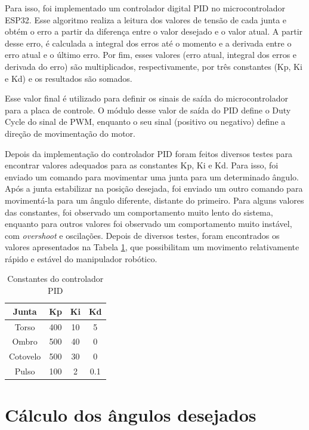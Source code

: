 Para isso, foi implementado um controlador digital PID no microcontrolador ESP32.
Esse algoritmo realiza a leitura dos valores de tensão de cada junta e obtém o erro a partir da diferença entre o valor desejado e o valor atual.
A partir desse erro, é calculada a integral dos erros até o momento e a derivada entre o erro atual e o último erro.
Por fim, esses valores (erro atual, integral dos erros e derivada do erro) são multiplicados, respectivamente, por três constantes (Kp, Ki e Kd) e os resultados são somados.

Esse valor final é utilizado para definir os sinais de saída do microcontrolador para a placa de controle.
O módulo desse valor de saída do PID define o Duty Cycle do sinal de PWM, enquanto o seu sinal (positivo ou negativo) define a direção de movimentação do motor.

Depois da implementação do controlador PID foram feitos diversos testes para encontrar valores adequados para as constantes Kp, Ki e Kd.
Para isso, foi enviado um comando para movimentar uma junta para um determinado ângulo.
Após a junta estabilizar na posição desejada, foi enviado um outro comando para movimentá-la para um ângulo diferente, distante do primeiro.
Para alguns valores das constantes, foi observado um comportamento muito lento do sistema,
enquanto para outros valores foi observado um comportamento muito instável, com \textit{overshoot} e oscilações.
Depois de diversos testes, foram encontrados os valores apresentados na Tabela \ref{tab:constantesPID},
que possibilitam um movimento relativamente rápido e estável do manipulador robótico.

\begin{table}[H]
    \centering
    \caption{Constantes do controlador PID}
    \begin{tabular}{|c|c|c|c|}
        \hline
        \textbf{Junta} & \textbf{Kp} & \textbf{Ki} & \textbf{Kd} \\
        \hline
        Torso    & 400 & 10 & 5 \\
        \hline
        Ombro    & 500 & 40 & 0 \\
        \hline
        Cotovelo & 500 & 30 & 0 \\
        \hline
        Pulso    & 100 & 2 & 0.1 \\
        \hline        
    \end{tabular}
    \label{tab:constantesPID}
\end{table}

\section[Cálculo dos ângulos desejados]{Cálculo dos ângulos desejados}
\label{sec:calculoAngulosDesejados}

